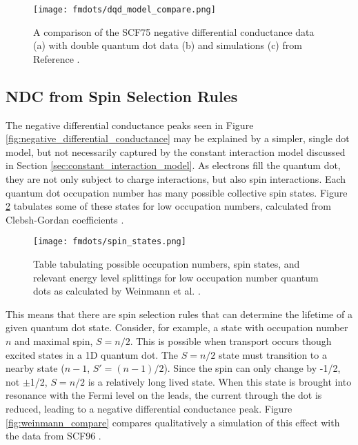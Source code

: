 \begin{figure}
    \centering
    \texttt{[image: fmdots/dqd\_model\_compare.png]}
    \caption{A comparison of the SCF75 negative differential conductance data (a) with double quantum dot data (b) and simulations (c) from Reference \cite{Buitelaar2008}.}
    \label{fig:dqd_model_compare}
\end{figure}

\subsection{NDC from Spin Selection Rules}
\label{sec:single_dot_model}

The negative differential conductance peaks seen in Figure \ref{fig:negative_differential_conductance} may be explained by a simpler, single dot model, but not necessarily captured by the constant interaction model discussed in Section \ref{sec:constant_interaction_model}. As electrons fill the quantum dot, they are not only subject to charge interactions, but also spin interactions. Each quantum dot occupation number has many possible collective spin states. Figure \ref{fig:spin_states} tabulates some of these states for low occupation numbers, calculated from Clebsh-Gordan coefficients \cite{Weinmann1994}.

\begin{figure}
    \centering
    \texttt{[image: fmdots/spin\_states.png]}
    \caption{Table tabulating possible occupation numbers, spin states, and relevant energy level splittings for low occupation number quantum dots as calculated by Weinmann et al. \cite{Weinmann1994}.}
    \label{fig:spin_states}
\end{figure}

This means that there are spin selection rules that can determine the lifetime of a given quantum dot state. Consider, for example, a state with occupation number $n$ and maximal spin, $S=n/2$. This is possible when transport occurs though excited states in a 1D quantum dot. The $S=n/2$ state must transition to a nearby state ($n-1$, $S'=(n-1)/2$). Since the spin can only change by -1/2, not $\pm$1/2, $S=n/2$ is a relatively long lived state. When this state is brought into resonance with the Fermi level on the leads, the current through the dot is reduced, leading to a negative differential conductance peak. Figure \ref{fig:weinmann_compare} compares qualitatively a simulation of this effect with the data from SCF96 \cite{Weinmann1995}. 

